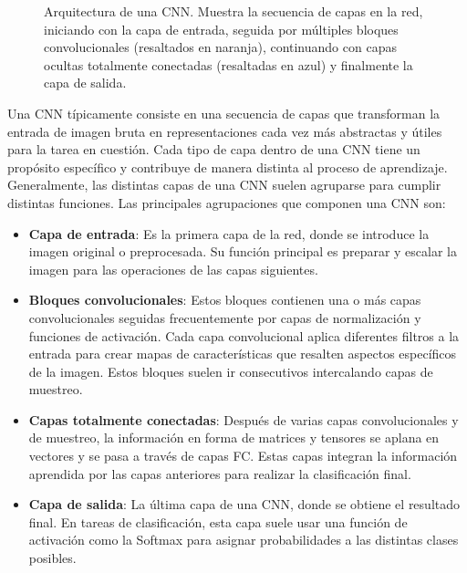 \begin{figure}
	\caption{Arquitectura de una CNN. Muestra la secuencia de capas en la red,
		iniciando con la capa de entrada, seguida por múltiples bloques convolucionales
		(resaltados en naranja), continuando con capas ocultas totalmente conectadas (resaltadas
		en azul) y finalmente la capa de salida. }
\end{figure}

Una CNN típicamente consiste en una secuencia de capas que transforman la entrada
de imagen bruta en representaciones cada vez más abstractas y útiles para la tarea
en cuestión. Cada tipo de capa dentro de una CNN tiene un propósito específico y
contribuye de manera distinta al proceso de aprendizaje. Generalmente, las
distintas capas de una CNN suelen agruparse para cumplir distintas funciones. Las
principales agrupaciones que componen una CNN son:

\begin{itemize}
	\item \textbf{Capa de entrada}: Es la primera capa de la red, donde se
	introduce la imagen original o preprocesada. Su función principal es preparar
	y escalar la imagen para las operaciones de las capas siguientes.
	
	\item \textbf{Bloques convolucionales}: Estos bloques contienen una o más capas
	convolucionales seguidas frecuentemente por capas de normalización y funciones
	de activación. Cada capa convolucional aplica diferentes filtros a la
	entrada para crear mapas de características que resalten aspectos
	específicos de la imagen. Estos bloques suelen ir consecutivos intercalando capas
	de muestreo.
	
	\item \textbf{Capas totalmente conectadas}: Después de varias capas convolucionales
	y de muestreo, la información en forma de matrices y tensores se aplana en
	vectores y se pasa a través de capas FC. Estas capas integran la información
	aprendida por las capas anteriores para realizar la clasificación final.
	
	\item \textbf{Capa de salida}: La última capa de una CNN, donde se obtiene el
	resultado final. En tareas de clasificación, esta capa suele usar una
	función de activación como la Softmax para asignar probabilidades a las
	distintas clases posibles.
\end{itemize}

